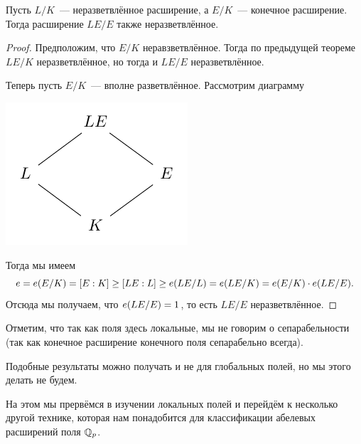 	\begin{corollary}
		Пусть $L/K$~--- неразветвлённое расширение, а $E/K$~--- конечное расширение. Тогда расширение $LE/E$ также неразветвлённое.  
	\end{corollary}
	\begin{proof}
		Предположим, что $E/K$ неравзветвлённое. Тогда по предыдущей теореме $LE/K$ неразветвлённое, но тогда и $LE/E$ неразветвлённое. 

		Теперь пусть $E/K$~--- вполне разветвлённое. Рассмотрим диаграмму 

		\begin{center}
			\includegraphics{lectures/6/pictures/cd_23.pdf}
		\end{center}

		Тогда мы имеем
		\[
			e = e\lr*{E/K} = [E : K] \ge [LE : L] \ge e\lr*{LE/L} = e\lr*{LE/K} = e\lr*{E/K} \cdot e\lr*{LE/E}.
		\]
		Отсюда мы получаем, что $e\lr*{LE/E} = 1$, то есть $LE/E$ неразветвлённое. 
	\end{proof}

	\begin{remark}
		Отметим, что так как поля здесь локальные, мы не говорим о сепарабельности (так как конечное расширение конечного поля сепарабельно всегда). 

		Подобные результаты можно получать и не для глобальных полей, но мы этого делать не будем. 
	\end{remark}

	На этом мы прервёмся в изучении локальных полей и перейдём к несколько другой технике, которая нам понадобится для классификации абелевых расширений поля $\mathbb{Q}_{p}$. 	
	 





